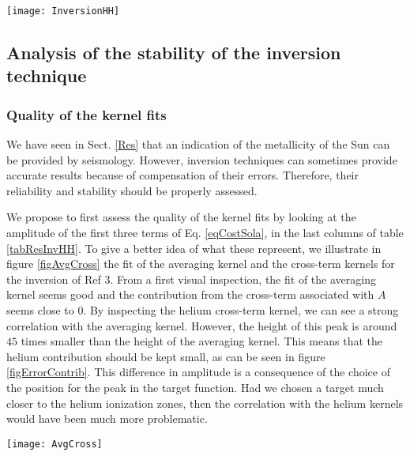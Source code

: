\documentclass[a4paper,fleqn,usenatbib]{mnras}
\begin{document}
 \begin{figure*}
	\centering
		\texttt{[image: InversionHH]}
	\caption{Inversion results for the hare-and-hounds exercises between the $17$ reference models and the target model of table \ref{tabHoundsProp}.}
		\label{figResHH}
\end{figure*} 
\subsection{Analysis of the stability of the inversion technique}\label{Stab}
\subsubsection{Quality of the kernel fits}
We have seen in Sect. \ref{Res} that an indication of the metallicity of the Sun can be provided by seismology. However, inversion techniques can sometimes provide accurate results because of compensation of their errors. Therefore, their reliability and stability should be properly assessed.  

We propose to first assess the quality of the kernel fits by looking at the amplitude of the first three terms of Eq. \ref{eqCostSola}, in the last columns of table \ref{tabResInvHH}. To give a better idea of what these represent, we illustrate in figure \ref{figAvgCross} the fit of the averaging kernel and the cross-term kernels for the inversion of Ref $3$. From a first visual inspection, the fit of the averaging kernel seems good and the contribution from the cross-term associated with $A$ seems close to $0$. By inspecting the helium cross-term kernel, we can see a strong correlation with the averaging kernel. However, the height of this peak is around $45$ times smaller than the height of the averaging kernel. This means that the helium contribution should be kept small, as can be seen in figure \ref{figErrorContrib}. This difference in amplitude is a consequence of the choice of the position for the peak in the target function. Had we chosen a target much closer to the helium ionization zones, then the correlation with the helium kernels would have been much more problematic. 
\begin{figure*}
	\centering
		\texttt{[image: AvgCross]}
	\caption{(Upper-left panel) Cross-term associated with $A$ in blue and the target function (being $0$ here) in green. (Upper-right panel) Cross-term associated with $Y$ in blue and the target function (being $0$) in green. (Lower panel) Averaging kernel of the inversion in blue and the respective target function in green.} 
		\label{figAvgCross}
\end{figure*} 
\end{document}
